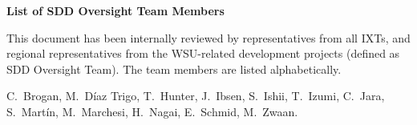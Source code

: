 \vspace*{-0.4cm}
\begin{center}
\textbf{\Large List of SDD Oversight Team Members}\\
\end{center}

This document has been internally reviewed by representatives from all IXTs, and regional representatives from the WSU-related development projects (defined as SDD Oversight Team). The team members are listed alphabetically.

C.~Brogan,
M.~Díaz Trigo,
T.~Hunter,
J.~Ibsen,
S.~Ishii,
T.~Izumi,
C.~Jara,
S.~Martín,
M.~Marchesi,
H.~Nagai,
E.~Schmid,
M.~Zwaan.



